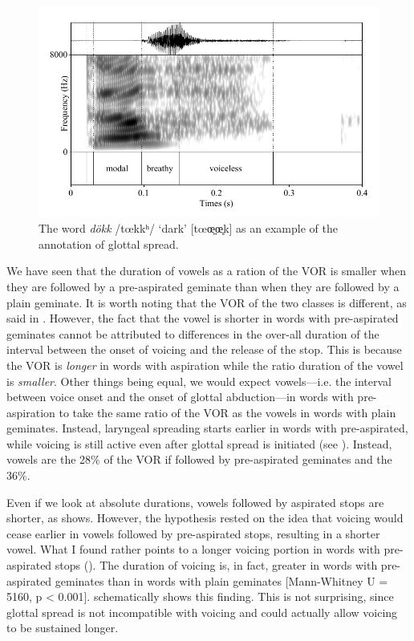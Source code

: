 \documentclass[11pt,a4paper,openany]{memoir}\usepackage[]{graphicx}\usepackage[]{color}
\begin{document}
\begin{figure}
\centering
\includegraphics[width=\textwidth]{dokk}
\caption{The word \textit{dökk} /tœkkʰ/ `dark' [tœœ̤̤œ̥k] as an example of the annotation of glottal spread.}
\label{f:glottal}
\end{figure}

We have seen that the duration of vowels as a ration of the VOR is smaller when they are followed by a pre-aspirated geminate than when they are followed by a plain geminate.
It is worth noting that the VOR of the two classes is different, as said in .
However, the fact that the vowel is shorter in words with pre-aspirated geminates cannot be attributed to differences in the over-all duration of the interval between the onset of voicing and the release of the stop.
This is because the VOR is \textit{longer} in words with aspiration while the ratio duration of the vowel is \textit{smaller}.
Other things being equal, we would expect vowels---i.e. the interval between voice onset and the onset of glottal abduction---in words with pre-aspiration to take the same ratio of the VOR as the vowels in words with plain geminates.
Instead, laryngeal spreading starts earlier in words with pre-aspirated, while voicing is still active even after glottal spread is initiated (see ).
Instead, vowels are the 28\% of the VOR if followed by pre-aspirated geminates and the 36\%.




Even if we look at absolute durations, vowels followed by aspirated stops are shorter, as  shows.
However, the hypothesis rested on the idea that voicing would cease earlier in vowels followed by pre-aspirated stops, resulting in a shorter vowel.
What I found rather points to a longer voicing portion in words with pre-aspirated stops ().
The duration of voicing is, in fact, greater in words with pre-aspirated geminates than in words with plain geminates [Mann-Whitney U = 5160, p < 0.001].
 schematically shows this finding.
This is not surprising, since glottal spread is not incompatible with voicing and could actually allow voicing to be sustained longer.
\end{document}
